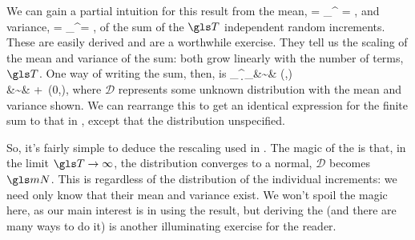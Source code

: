 We can gain a partial intuition for this result from the mean,
\be
{} = \sum_{}^\T \ave{\d\gv_\gtau} = \T \ave{\d\gv},
\ee
and variance,
\be
\var\left[\sum_{\gtau=1}^\T \d\gv_\gtau\right] = \sum_{}^\T \var\left[\d\gv_\gtau\right] = \T \var[\d\gv],
\ee
of the sum of the $\T$ independent random increments. These are easily derived and are a worthwhile exercise. They tell us the scaling of the mean and variance of the sum: both grow linearly with the number of terms, $\T$. One way of writing the sum, then, is
\bea
\sum_{}^\T \d\gv_\gtau &\sim& (\T \ave{\d\gv},\T \var[\d\gv]) \\
&\sim& \T \ave{\d\gv} + \sqrt{\T}\,(0,\var[\d\gv]),
\eea
where $\mathcal{D}$ represents some unknown distribution with the mean and variance shown. We can rearrange this to get an identical expression for the finite sum to that in , except that the distribution unspecified.

So, it's fairly simple to deduce the rescaling used in . The magic of the \CLT is that, in the limit $\T\to\infty$, the distribution converges to a normal, \ie $\mathcal{D}$ becomes $\mN$. This is regardless of the distribution of the individual increments: we need only know that their mean and variance exist. We won't spoil the magic here, as our main interest is in using the result, but deriving the \CLT (and there are many ways to do it) is another illuminating exercise for the reader.

%
%
%

